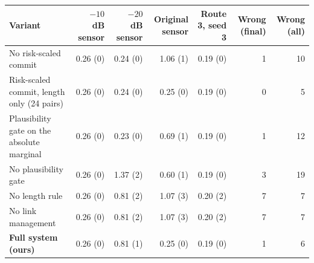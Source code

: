 \begin{tabular}{lrrrrrr}
\toprule
Variant & $-10$~dB sensor & $-20$~dB sensor & Original sensor & Route 3, seed 3 & Wrong (final) & Wrong (all) \\
\midrule
No risk-scaled commit & 0.26 (0) & 0.24 (0) & 1.06 (1) & 0.19 (0) & 1 & 10 \\
Risk-scaled commit, length only (24 pairs) & 0.26 (0) & 0.24 (0) & 0.25 (0) & 0.19 (0) & 0 & 5 \\
Plausibility gate on the absolute marginal & 0.26 (0) & 0.23 (0) & 0.69 (1) & 0.19 (0) & 1 & 12 \\
No plausibility gate & 0.26 (0) & 1.37 (2) & 0.60 (1) & 0.19 (0) & 3 & 19 \\
No length rule & 0.26 (0) & 0.81 (2) & 1.07 (3) & 0.20 (2) & 7 & 7 \\
No link management & 0.26 (0) & 0.81 (2) & 1.07 (3) & 0.20 (2) & 7 & 7 \\
\midrule
\textbf{Full system (ours)} & 0.26 (0) & 0.81 (1) & 0.25 (0) & 0.19 (0) & 1 & 6 \\
\bottomrule
\end{tabular}
